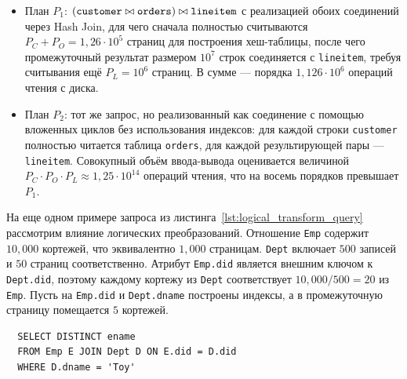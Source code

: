 \documentclass[fontsize=14pt, russian]{scrartcl}
\begin{document}
\begin{itemize}
  \item План \(P_1\):
        \((\texttt{customer} \bowtie \texttt{orders}) \bowtie \texttt{lineitem}\)
        с реализацией обоих соединений через Hash Join, для чего сначала
        полностью считываются \(P_C + P_O = 1{,}26 \cdot 10^5\) страниц для
        построения хеш-таблицы, после чего промежуточный результат размером
        \(10^7\) строк соединяется с \texttt{lineitem}, требуя считывания ещё %
        \(P_L = 10^6\) страниц. В сумме --- порядка \(1{,}126 \cdot 10^6\)
        операций чтения с диска.
  \item План \(P_2\): тот же запрос, но реализованный как соединение с помощью
        вложенных циклов без использования индексов: для каждой строки
        \texttt{customer} полностью читается таблица \texttt{orders}, для каждой
        результирующей пары --- \texttt{lineitem}. Совокупный объём ввода-вывода
        оценивается величиной
        \(P_C \cdot P_O \cdot P_L \approx 1{,}25 \cdot 10^{14}\) операций
        чтения, что на восемь порядков превышает \(P_1\).
\end{itemize}

На еще одном примере запроса из листинга~\ref{lst:logical_transform_query}
рассмотрим влияние логических преобразований. Отношение \texttt{Emp} содержит
\(10{,}000\) кортежей, что эквивалентно \(1{,}000\) страницам. \texttt{Dept}
включает \(500\) записей и \(50\) страниц соответственно. Атрибут
\texttt{Emp.did} является внешним ключом к \texttt{Dept.did}, поэтому каждому
кортежу из \texttt{Dept} соответствует \(10{,}000 / 500 = 20\) из \texttt{Emp}.
Пусть на \texttt{Emp.did} и \texttt{Dept.dname} построены индексы, а в
промежуточную страницу помещается \(5\) кортежей.

\begin{listing}
  \caption{Пример запроса с проекцией, фильтрацией и соединением.}
  \label{lst:logical_transform_query}
  \begin{verbatim}
  SELECT DISTINCT ename
  FROM Emp E JOIN Dept D ON E.did = D.did
  WHERE D.dname = 'Toy'
  \end{verbatim}
\end{listing}
\end{document}
